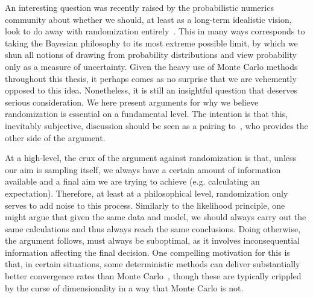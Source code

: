 An interesting question was recently raised by the probabilistic numerics~\citep{hennig2015probabilistic}
community about whether we should, at least as a long-term idealistic vision, look to do away with randomization entirely~\citep{schober2017thesis}.
This in many ways corresponds to taking the Bayesian philosophy to its most extreme possible
limit, by which we shun all notions of drawing from probability distributions and view probability only as a measure
of uncertainty.  Given the heavy use of Monte Carlo methods throughout this thesis,
it perhaps comes as no surprise that we are vehemently opposed to this idea.  Nonetheless, it is still an insightful
question that deserves serious consideration.  We here present arguments for why we believe randomization is essential
on a fundamental level. The intention is that this, inevitably subjective,
discussion should be seen as a pairing to~\citep{schober2017thesis}, who provides the other side of the argument.

 At a high-level, the crux of the argument against randomization is that, 
 unless our aim 
is sampling itself, we always have a certain amount of information available and a final aim we are trying to achieve (e.g.
calculating an expectation).  Therefore, at least at a philosophical level, randomization only serves to add noise to this
process.  
Similarly to the likelihood principle, one might argue that given the same data and model, we should 
always carry out the same calculations and thus always reach the same conclusions.  Doing otherwise,
the argument follows, must always be suboptimal, as it involves inconsequential information affecting the final
decision.  One compelling motivation for this is that, in certain situations, some deterministic
methods can deliver substantially better convergence rates than Monte Carlo~\citep{briol2016fwbq,caflisch1998monte}, 
though these are typically crippled by the curse of dimensionality in a way that Monte Carlo is not.

